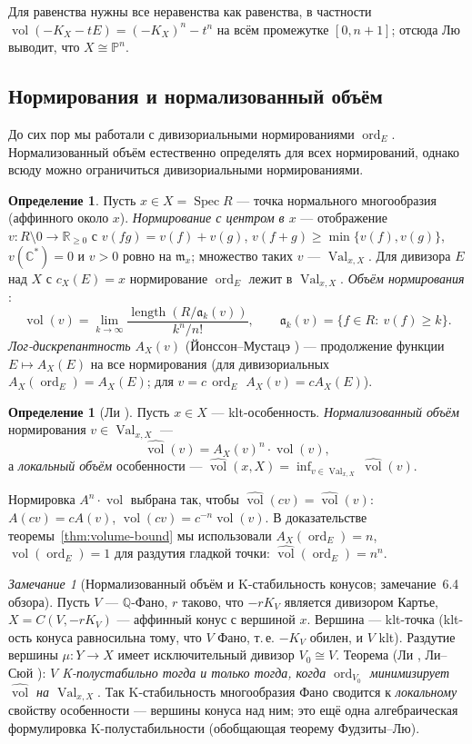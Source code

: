\documentclass[11pt,a4paper]{article}
\theoremstyle{plain}
\theoremstyle{definition}
\newtheorem{definition}[theorem]{Определение}
\theoremstyle{remark}
\newtheorem{remark}[theorem]{Замечание}
\renewcommand{\C}{\mathbb{C}}
\newcommand{\Q}{\mathbb{Q}}
\newcommand{\R}{\mathbb{R}}
\newcommand{\PP}{\mathbb{P}}
\newcommand{\mm}{\mathfrak{m}}
\newcommand{\fa}{\mathfrak{a}}
\DeclareMathOperator{\ord}{ord}
\DeclareMathOperator{\vol}{vol}
\DeclareMathOperator{\length}{length}
\DeclareMathOperator{\Spec}{Spec}
\DeclareMathOperator{\Val}{Val}
\newcommand{\hvol}{\widehat{\vol}}
\begin{document}
Для равенства нужны все неравенства как равенства, в частности $\vol(-K_X-tE)=(-K_X)^n-t^n$ на всём
промежутке $[0,n+1]$; отсюда Лю \cite{Liu18} выводит, что $X\cong\PP^n$.

\subsection{Нормирования и нормализованный объём}

До сих пор мы работали с дивизориальными нормированиями $\ord_E$. Нормализованный объём естественно
определять для всех нормирований, однако всюду можно ограничиться дивизориальными нормированиями.

\begin{definition}
Пусть $x\in X=\Spec R$ --- точка нормального многообразия (аффинного около $x$). \emph{Нормирование
с центром в $x$} --- отображение $v\colon R\setminus0\to\R_{\ge0}$ с $v(fg)=v(f)+v(g)$,
$v(f+g)\ge\min\{v(f),v(g)\}$, $v(\C^*)=0$ и $v>0$ ровно на $\mm_x$; множество таких $v$ ---
$\Val_{x,X}$. Для дивизора $E$ над $X$ с $c_X(E)=x$ нормирование $\ord_E$ лежит в $\Val_{x,X}$.
\emph{Объём нормирования} \cite{ELS}:
\[
\vol(v)=\lim_{k\to\infty}\frac{\length(R/\fa_k(v))}{k^n/n!},\qquad\fa_k(v)=\{f\in R:\ v(f)\ge k\} .
\]
\emph{Лог-дискрепантность} $A_X(v)$ (Йонссон--Мустацэ \cite{JM}) --- продолжение функции
$E\mapsto A_X(E)$ на все нормирования (для дивизориальных $A_X(\ord_E)=A_X(E)$; для $v=c\,\ord_E$
$A_X(v)=cA_X(E)$).
\end{definition}

\begin{definition}[{Ли \cite{Li18}}]\label{def:nvol}
Пусть $x\in X$ --- klt-особенность. \emph{Нормализованный объём} нормирования $v\in\Val_{x,X}$ ---
\[
\hvol(v)=A_X(v)^n\cdot\vol(v),
\]
а \emph{локальный объём} особенности ---
$\hvol(x,X)=\inf_{v\in\Val_{x,X}}\hvol(v)$.
\end{definition}

Нормировка $A^n\cdot\vol$ выбрана так, чтобы $\hvol(cv)=\hvol(v)$: $A(cv)=cA(v)$,
$\vol(cv)=c^{-n}\vol(v)$. В доказательстве теоремы~\ref{thm:volume-bound} мы использовали
$A_X(\ord_E)=n$, $\vol(\ord_E)=1$ для раздутия гладкой точки: $\hvol(\ord_E)=n^n$.

\begin{remark}[Нормализованный объём и K-стабильность конусов; замечание~6.4 обзора]\label{rem:cone-nvol}
Пусть $V$ --- $\Q$-Фано, $r$ таково, что $-rK_V$ является дивизором Картье, $X=C(V,-rK_V)$ --- аффинный конус с
вершиной $x$. Вершина --- klt-точка (klt-ость конуса равносильна тому, что $V$ Фано, т.\,е. $-K_V$
обилен, и $V$ klt). Раздутие вершины $\mu\colon Y\to X$ имеет исключительный дивизор $V_0\cong V$.
Теорема (Ли \cite{Li17}, Ли--Сюй \cite{LX20}): \emph{$V$ K-полустабильно тогда и только тогда, когда
$\ord_{V_0}$ минимизирует $\hvol$ на $\Val_{x,X}$}. Так K-стабильность многообразия Фано
сводится к \emph{локальному} свойству особенности --- вершины конуса над ним; это ещё одна
алгебраическая формулировка K-полустабильности (обобщающая теорему Фудзиты--Лю).
\end{remark}
\end{document}
